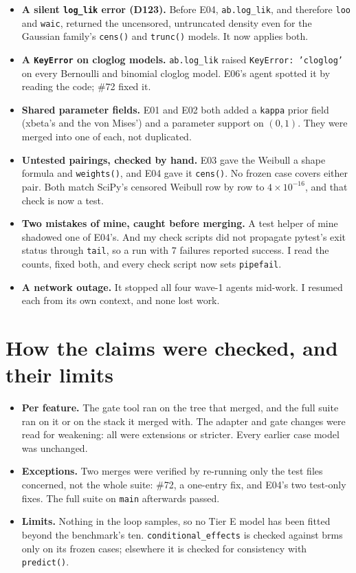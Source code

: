 \documentclass[11pt]{article}
\newcommand{\code}[1]{\texttt{#1}}
\begin{document}
\begin{itemize}
\item \textbf{A silent \code{log\_lik} error (D123).} Before E04, \code{ab.log\_lik}, and therefore \code{loo} and
  \code{waic}, returned the uncensored, untruncated density even for the Gaussian family's \code{cens()} and
  \code{trunc()} models. It now applies both.
\item \textbf{A \code{KeyError} on cloglog models.} \code{ab.log\_lik} raised \code{KeyError: 'cloglog'} on every Bernoulli and
  binomial cloglog model. E06's agent spotted it by reading the code; \#72 fixed it.
\item \textbf{Shared parameter fields.} E01 and E02 both added a \code{kappa} prior field (xbeta's and the von Mises') and a
  parameter support on $(0, 1)$. They were merged into one of each, not duplicated.
\item \textbf{Untested pairings, checked by hand.} E03 gave the Weibull a shape formula and \code{weights()}, and E04 gave it
  \code{cens()}. No frozen case covers either pair. Both match SciPy's censored Weibull row by row to $4\times10^{-16}$,
  and that check is now a test.
\item \textbf{Two mistakes of mine, caught before merging.} A test helper of mine shadowed one of E04's. And my check
  scripts did not propagate pytest's exit status through \code{tail}, so a run with 7 failures reported success. I read
  the counts, fixed both, and every check script now sets \code{pipefail}.
\item \textbf{A network outage.} It stopped all four wave-1 agents mid-work. I resumed each from its own context, and none
  lost work.
\end{itemize}

\section{How the claims were checked, and their limits}

\begin{itemize}
\item \textbf{Per feature.} The gate tool ran on the tree that merged, and the full suite ran on it or on the stack it
  merged with. The adapter and gate changes were read for weakening: all were extensions or stricter. Every earlier case
  model was unchanged.
\item \textbf{Exceptions.} Two merges were verified by re-running only the test files concerned, not the whole suite:
  \#72, a one-entry fix, and E04's two test-only fixes. The full suite on \code{main} afterwards passed.
\item \textbf{Limits.} Nothing in the loop samples, so no Tier E model has been fitted beyond the benchmark's ten.
  \code{conditional\_effects} is checked against brms only on its frozen cases; elsewhere it is checked for consistency
  with \code{predict()}.
\end{itemize}
\end{document}
